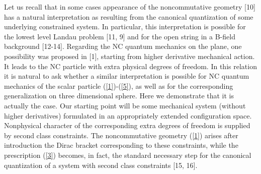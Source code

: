 \documentclass[paper a4]{article}
\begin{document}
Let us recall that in some cases appearance of the noncommutative
geometry [10] has a natural interpretation as
resulting from the canonical
quantization of some underlying constrained system. In particular, this
interpretation is possible for the lowest level Landau problem [11, 9]
and for the open string in a B-field background [12-14]. Regarding the
NC quantum mechanics on the plane, one possibility was proposed in [1],
starting from higher
derivative mechanical action. It leads to the NC particle
with extra physical degrees of freedom. In this relation it is natural
to ask whether a similar interpretation is possible for NC quantum
mechanics of the scalar particle (\ref{1})-(\ref{5}), as well as for
the corresponding generalization on three dimensional sphere. Here we
demonstrate that it is actually the case.
Our starting point will be some mechanical system (without higher
derivatives) formulated in
an appropriately extended configuration space. Nonphysical character of
the corresponding extra degrees of freedom is supplied by second
class constraints.
The noncommutative geometry (\ref{1})
arises after introduction the Dirac bracket corresponding to these
constraints, while the
prescription (\ref{3}) becomes, in fact, the standard necessary step
for the canonical quantization of a system with second class constraints
[15, 16].
\end{document}
